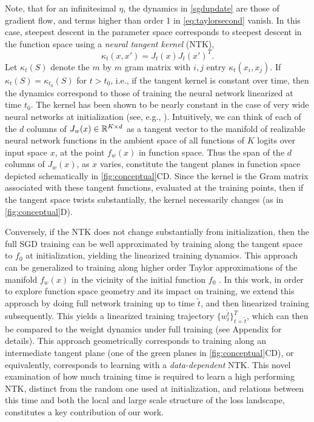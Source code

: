 \documentclass{article}
\begin{document}
Note, that for an infinitesimal $\eta$, the dynamics in \cref{sgdupdate} are those of gradient flow, and terms higher than order 1 in \cref{eq:taylorsecond} vanish. 
In this case, steepest descent in the parameter space corresponds to steepest descent in the function space using a \emph{neural tangent kernel} (NTK), 
\[
\kappa_t(x,x') = J_t(x) J_t(x')^T.
\]
Let $\kappa_t(S)$ denote the $m$ by $m$ gram matrix with $i,j$ entry
$\kappa_t(x_i,x_j)$.
If $\kappa_t(S) = \kappa_{t_0}(S)$ for $t>t_0$, i.e., if the tangent kernel is constant over time, then the dynamics correspond to those of training the neural network linearized at time $t_0$. 
The kernel has been shown to be nearly constant in the case of very wide neural networks at initialization (see, e.g., \citep{jacot2018neural,zou2019improved,ji2019polylogarithmic,du2018gradient,lee2019wide,chen2019much}).
Intuitively, we can think of each of the $d$ columns of $J_w(x) \in \mathbb{R}^{K \times d}$ as a tangent vector to the manifold of realizable neural network functions in the ambient space of all functions of $K$ logits over input space $x$, at the point $f_w(x)$ in function space. 
Thus the span of the $d$ columns of $J_w(x)$, as $x$ varies, constitute the tangent planes in function space depicted schematically in \cref{fig:conceptual}CD.
Since the kernel is the Gram matrix associated with these tangent functions, evaluated at the training points, then if the tangent space twists substantially, the kernel necessarily changes (as in \cref{fig:conceptual}D). 

Conversely, if the NTK does not change substantially from initialization, then the full SGD training can be well approximated by training along the tangent space to $f_0$ at initialization, yielding the linearized training dynamics.  
This approach can be generalized to training along higher order Taylor approximations of the manifold $f_w(x)$ in the vicinity of the initial function $f_0$ \cite{bai2020taylorized}.  
In this work, in order to explore function space geometry and its impact on training, we extend this approach by doing full network training up to time $\tilde t$, and then linearized training subsequently. 
%
%
%
This yields a linearized training trajectory $\{w^{\tilde{t}}_t \}_{t= \tilde{t}}^{T}$, which can then be compared to the weight dynamics under full training (see Appendix for details). 
%
This approach geometrically corresponds to training along an intermediate tangent plane (one of the green planes in \cref{fig:conceptual}CD), or equivalently, corresponds to learning with a \emph{data-dependent} NTK.  
This novel examination of how much training time is required to learn a high performing NTK, distinct from the random one used at initialization, and relations between this time and both the local and large scale structure of the loss landscape, constitutes a key contribution of our work. 
\end{document}
